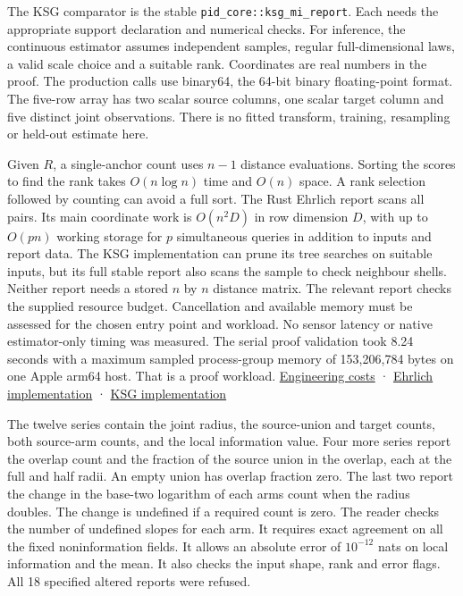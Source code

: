 The KSG comparator is the stable \texttt{pid\_core::ksg\_mi\_report}. Each needs the appropriate support declaration and numerical checks. For inference, the continuous estimator assumes independent samples, regular full-dimensional laws, a valid scale choice and a suitable rank. Coordinates are real numbers in the proof. The production calls use binary64, the 64-bit binary floating-point format. The five-row array has two scalar source columns, one scalar target column and five distinct joint observations. There is no fitted transform, training, resampling or held-out estimate here.

Given \(R\), a single-anchor count uses \(n-1\) distance evaluations. Sorting the scores to find the rank takes \(O(n\log n)\) time and \(O(n)\) space. A rank selection followed by counting can avoid a full sort. The Rust Ehrlich report scans all pairs. Its main coordinate work is \(O(n^2D)\) in row dimension \(D\), with up to \(O(pn)\) working storage for \(p\) simultaneous queries in addition to inputs and report data. The KSG implementation can prune its tree searches on suitable inputs, but its full stable report also scans the sample to check neighbour shells. Neither report needs a stored \(n\) by \(n\) distance matrix. The relevant report checks the supplied resource budget. Cancellation and available memory must be assessed for the chosen entry point and workload. No sensor latency or native estimator-only timing was measured. The serial proof validation took 8.24 seconds with a maximum sampled process-group memory of 153,206,784 bytes on one Apple arm64 host. That is a proof workload. \href{https://github.com/sepahead/pid-rs/blob/main/RUST_IMPLEMENTATION_AND_COST.md}{Engineering costs} · \href{https://github.com/sepahead/pid-rs/blob/main/crates/pid-core/src/isx.rs}{Ehrlich implementation} · \href{https://github.com/sepahead/pid-rs/blob/main/crates/pid-core/src/ksg.rs}{KSG implementation}

The twelve series contain the joint radius, the source-union and target counts, both source-arm counts, and the local information value. Four more series report the overlap count and the fraction of the source union in the overlap, each at the full and half radii. An empty union has overlap fraction zero. The last two report the change in the base-two logarithm of each arm\textquotesingle s count when the radius doubles. The change is undefined if a required count is zero. The reader checks the number of undefined slopes for each arm. It requires exact agreement on all the fixed noninformation fields. It allows an absolute error of \(10^{-12}\) nats on local information and the mean. It also checks the input shape, rank and error flags. All 18 specified altered reports were refused.

